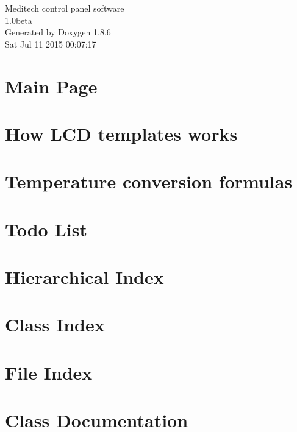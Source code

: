 \documentclass[twoside]{book}
\newcommand{\clearemptydoublepage}{%
  \newpage{\pagestyle{empty}\cleardoublepage}%
}
\begin{document}
\hypersetup{pageanchor=false}
\begin{titlepage}
\vspace*{7cm}
\begin{center}%
{\Large Meditech control panel software \\[1ex]\large 1.\-0beta }\\
\vspace*{1cm}
{\large Generated by Doxygen 1.8.6}\\
\vspace*{0.5cm}
{\small Sat Jul 11 2015 00:07:17}\\
\end{center}
\end{titlepage}
\clearemptydoublepage
\tableofcontents
\clearemptydoublepage
{}
\hypersetup{pageanchor=true}

\chapter{Main Page}
\label{index}\hypertarget{index}{}
\chapter{How L\-C\-D templates works}
\label{lcd_template}
\hypertarget{lcd_template}{}

\chapter{Temperature conversion formulas}
\label{temp_convert}
\hypertarget{temp_convert}{}

\chapter{Todo List}
\label{todo}
\hypertarget{todo}{}

\chapter{Hierarchical Index}

\chapter{Class Index}

\chapter{File Index}

\chapter{Class Documentation}












\end{document}
